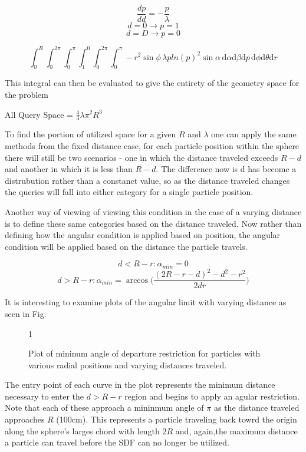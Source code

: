 $$ \frac{dp}{dd} = -\frac{p}{\lambda} $$
$$ d = 0 \rightarrow p = 1 $$
$$ d = D \rightarrow p = 0 $$

$$ \int_{0}^{R}\int_{0}^{2\pi}\int_{0}^{\pi}\int_{1}^{0}\int_{0}^{2\pi}\int_{0}^{\pi}
-r^2\sin{\phi} \, \lambda p ln(p)^2 \sin{\alpha} \, \mathrm{d}\alpha \mathrm{d}\beta \mathrm{d}p \, \mathrm{d}\phi
\mathrm{d}\theta \mathrm{d}r $$

This integral can then be evaluated to give the entirety of the geometry space
for the problem

\begin{center}
All Query Space = $\frac{4}{3} \lambda \pi^2 R^3$
\end{center}

To find the portion of utilized space for a given $R$ and $\lambda$ one can
apply the same methods from the fixed distance case, for each particle position
within the sphere there will still be two scenarios - one in which the distance
traveled exceeds $R-d$ and another in which it is less than $R-d$. The difference
now is d has become a distrubution rather than a constanct value, so as the
distance traveled changes the queries will fall into either category for a
single particle position.


Another way of viewing of viewing this condition in the case of a varying
distance is to define these same categories based on the distance traveled. Now
rather than defining how the angular condition is applied based on position, the
angular condition will be applied based on the distance the particle travels.


$$ d < R-r : \alpha_{min} = 0 $$
$$ d > R-r : \alpha_{min} = \arccos\Bigg ( \frac{(2R-r-d)^2-d^2-r^2}{2 d r} \Bigg
) $$

It is interesting to examine plots of the angular limit with varying distance as
seen in Fig. \label{fig:alpha_min}

\begin{figure}[ht] \label{fig:alpha_min}

\centering
{1\textwidth}
\caption{Plot of mininum angle of departure restriction for particles with
various radial positions and varying distances traveled.}
\end{figure}

The entry point of each curve in the plot represents the minimum distance
necessary to enter the $d > R-r$ region and begins to apply an agular
restriction. Note that each of these approach a mininmum angle of $\pi$ as the
distance traveled approaches $R$ (100cm). This represents a particle traveling
back towrd the origin along the sphere's larges chord with length $2R$ and,
again,the maximum distance a particle can travel before the SDF can no longer be
utilized.

